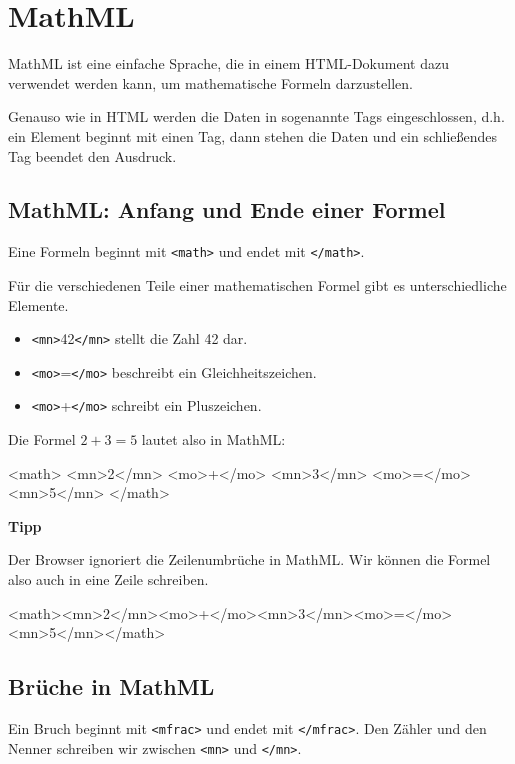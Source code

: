 \section{MathML}

MathML ist eine einfache Sprache, die in einem HTML-Dokument dazu verwendet werden kann, um mathematische Formeln darzustellen.

Genauso wie in HTML werden die Daten in sogenannte Tags eingeschlossen, d.h. ein Element beginnt mit einen Tag, dann stehen die Daten und ein schließendes Tag beendet den Ausdruck. 

\subsection*{MathML: Anfang und Ende einer Formel}

Eine Formeln beginnt mit \texttt{<math>} und endet mit \texttt{</math>}.

Für die verschiedenen Teile einer mathematischen Formel gibt es unterschiedliche Elemente.
\begin{itemize}
	\item \texttt{<mn>}42\texttt{</mn>} stellt die Zahl 42 dar.
	\item \texttt{<mo>}=\texttt{</mo>} beschreibt ein Gleichheitszeichen.
	\item \texttt{<mo>}+\texttt{</mo>} schreibt ein Pluszeichen.
\end{itemize}

Die Formel $2 + 3 = 5$ lautet also in MathML:

\begin{codeHTML}
<math>
	<mn>2</mn>
	<mo>+</mo>
	<mn>3</mn>
	<mo>=</mo>
	<mn>5</mn>
</math>
\end{codeHTML}

\textbf{Tipp}

Der Browser ignoriert die Zeilenumbrüche in MathML. Wir können die Formel also auch in eine Zeile schreiben.

\begin{codeHTML}
<math><mn>2</mn><mo>+</mo><mn>3</mn><mo>=</mo><mn>5</mn></math>
\end{codeHTML}

\subsection*{Brüche in MathML}

Ein Bruch beginnt mit \texttt{<mfrac>} und endet mit \texttt{</mfrac>}. Den Zähler und den Nenner schreiben wir zwischen \texttt{<mn>} und \texttt{</mn>}.


